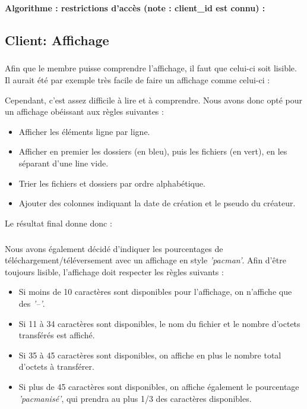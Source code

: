 \documentclass[12pt,a4paper,twoside]{article}
\begin{document}
				\paragraph*{Algorithme : restrictions d'accès (note : client\_id est connu) :}
				
				
		\subsection{Client: Affichage} %
			\subparagraph*{}
				Afin que le membre puisse comprendre l'affichage, il faut que celui-ci soit lisible. Il aurait été par exemple très facile de faire un affichage comme celui-ci :
				
				Cependant, c'est assez difficile à lire et à comprendre. Nous avons donc opté pour un affichage obéissant aux règles suivantes :
				\begin{itemize}
					\item{} Afficher les éléments ligne par ligne.
					\item{} Afficher en premier les dossiers (en bleu), puis les fichiers (en vert), en les séparant d'une line vide.
					\item{} Trier les fichiers et dossiers par ordre alphabétique.
					\item{} Ajouter des colonnes indiquant la date de création et le pseudo du créateur.
				\end{itemize}
				Le résultat final donne donc :
				
			\subparagraph*{}
				Nous avons également décidé d'indiquer les pourcentages de téléchargement/téléversement avec un affichage en style \textit{'pacman'}. Afin d'être toujours lisible, l'affichage doit respecter les règles suivants :
				\begin{itemize}
					\item{} Si moins de 10 caractères sont disponibles pour l'affichage, on n'affiche que des \textit{'–'}.
					\item{} Si 11 à 34 caractères sont disponibles, le nom du fichier et le nombre d'octets transférés est affiché.
					\item{} Si 35 à 45 caractères sont disponibles, on affiche en plus le nombre total d'octets à transférer.
					\item{} Si plus de 45 caractères sont disponibles, on affiche également le pourcentage \textit{'pacmanisé'}, qui prendra au plus 1/3 des caractères disponibles.
				 \end{itemize}
\end{document}
